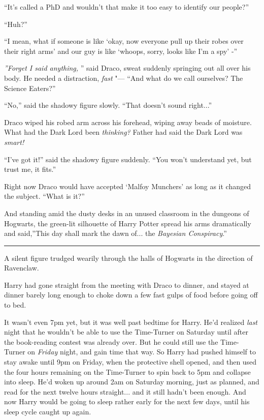 ``It's called a PhD and wouldn't that make it too easy to identify our
people?''

``Huh?''

``I mean, what if someone is like `okay, now everyone pull up their
robes over their right arms' and our guy is like `whoops, sorry, looks
like I'm a spy' -''

\emph{''Forget I said anything,} '' said Draco, sweat suddenly springing
out all over his body. He needed a distraction, \emph{fast} "--- ``And what
do we call ourselves? The Science Eaters?''

``No,'' said the shadowy figure slowly. ``That doesn't sound
right...''

Draco wiped his robed arm across his forehead, wiping away beads of
moisture. What had the Dark Lord been \emph{thinking?} Father had said
the Dark Lord was \emph{smart!}

``I've got it!'' said the shadowy figure suddenly. ``You won't
understand yet, but trust me, it fits.''

Right now Draco would have accepted `Malfoy Munchers' as long as it
changed the subject. ``What is it?''

And standing amid the dusty desks in an unused classroom in the dungeons
of Hogwarts, the green-lit silhouette of Harry Potter spread his arms
dramatically and said,''This day shall mark the dawn of... the
\emph{Bayesian Conspiracy}.''

\begin{center}\rule{3in}{0.4pt}\end{center}

A silent figure trudged wearily through the halls of Hogwarts in the
direction of Ravenclaw.

Harry had gone straight from the meeting with Draco to dinner, and
stayed at dinner barely long enough to choke down a few fast gulps of
food before going off to bed.

It wasn't even 7pm yet, but it was well past bedtime for Harry. He'd
realized \emph{last} night that he wouldn't be able to use the
Time-Turner on Saturday until after the book-reading contest was already
over. But he could still use the Time-Turner on \emph{Friday} night, and
gain time that way. So Harry had pushed himself to stay awake until 9pm
on Friday, when the protective shell opened, and then used the four
hours remaining on the Time-Turner to spin back to 5pm and collapse into
sleep. He'd woken up around 2am on Saturday morning, just as planned,
and read for the next twelve hours straight... and it still hadn't
been enough. And now Harry would be going to sleep rather early for the
next few days, until his sleep cycle caught up again.


